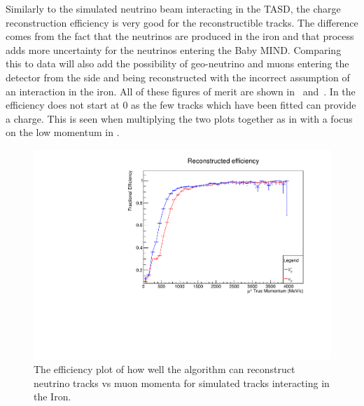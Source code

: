 Similarly to the simulated neutrino beam interacting in the TASD, the charge reconstruction efficiency is very good for the reconstructible tracks. The difference comes from the fact that the neutrinos are produced in the iron and that process adds more uncertainty for the neutrinos entering the Baby MIND. Comparing this to data will also add the possibility of geo-neutrino and muons entering the detector from the side and being reconstructed with the incorrect assumption of an interaction in the iron.  All of these figures of merit are shown in~ and~.
In  the efficiency does not start at 0 as the few tracks which have been fitted can provide a charge. This is seen when multiplying the two plots together as in  with a focus on the low momentum in .




\begin{figure}[h!]
\centering
\includegraphics[width=.9\textwidth]{figures/NeutrinoChap/Neutrino/T2KIronRecEff.pdf}
\caption{The efficiency plot of how well the algorithm can reconstruct neutrino tracks vs muon momenta for simulated tracks interacting in the Iron.}
\label{fig:IronMINDfitted}
\end{figure}

